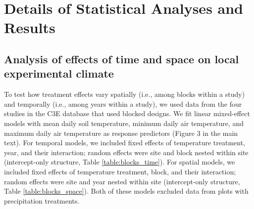 \documentclass{article}
\begin{document}
\section* {Details of Statistical Analyses and Results}
\subsection* {Analysis of effects of time and space on local experimental climate}
To test how treatment effects vary spatially (i.e., among blocks within a study) and temporally (i.e., among years within a study), we used data from the four studies in the C3E database that used blocked designs. We fit linear mixed-effect models with mean daily soil temperature, minimum daily air temperature, and maximum daily air temperature as response predictors (Figure 3 in the main text). For temporal models, we included fixed effects of temperature treatment, year, and their interaction; random effects were site and block nested within site (intercept-only structure, Table \ref{table:blocks_time}). For spatial models, we included fixed effects of temperature treatment, block, and their interaction; random effects were site and year nested within site (intercept-only structure, Table \ref{table:blocks_space}). Both of these models excluded data from plots with precipitation treatments. 
\end{document}
